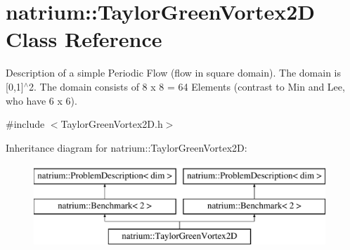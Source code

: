 \hypertarget{classnatrium_1_1TaylorGreenVortex2D}{\section{natrium\-:\-:Taylor\-Green\-Vortex2\-D Class Reference}
\label{classnatrium_1_1TaylorGreenVortex2D}
}


Description of a simple Periodic Flow (flow in square domain). The domain is \mbox{[}0,1\mbox{]}$^\wedge$2. The domain consists of 8 x 8 = 64 Elements (contrast to Min and Lee, who have 6 x 6).  




{\ttfamily \#include $<$Taylor\-Green\-Vortex2\-D.\-h$>$}

Inheritance diagram for natrium\-:\-:Taylor\-Green\-Vortex2\-D\-:\begin{figure}[H]
\begin{center}
\leavevmode
\includegraphics[height=3.000000cm]{classnatrium_1_1TaylorGreenVortex2D}
\end{center}
\end{figure}
